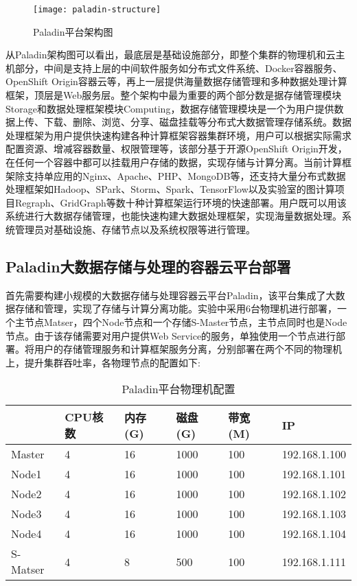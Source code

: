 \begin{figure}[H] %
	\centering
	\texttt{[image: paladin-structure]}
	\caption{Paladin平台架构图}
\end{figure}

从Paladin架构图可以看出，最底层是基础设施部分，即整个集群的物理机和云主机部分，中间是支持上层的中间软件服务如分布式文件系统、Docker容器服务、OpenShift Origin容器云等，再上一层提供海量数据存储管理和多种数据处理计算框架，顶层是Web服务层。整个架构中最为重要的两个部分数是据存储管理模块Storage和数据处理框架模块Computing，数据存储管理模块是一个为用户提供数据上传、下载、删除、浏览、分享、磁盘挂载等分布式大数据管理存储系统。数据处理框架为用户提供快速构建各种计算框架容器集群环境，用户可以根据实际需求配置资源、增减容器数量、权限管理等，该部分基于开源OpenShift Origin开发，在任何一个容器中都可以挂载用户存储的数据，实现存储与计算分离。当前计算框架除支持单应用的Nginx、Apache、PHP、MongoDB等，还支持大量分布式数据处理框架如Hadoop、SPark、Storm、Spark、TensorFlow以及实验室的图计算项目Regraph、GridGraph等数十种计算框架运行环境的快速部署。用户既可以用该系统进行大数据存储管理，也能快速构建大数据处理框架，实现海量数据处理。系统管理员对基础设施、存储节点以及系统权限等进行管理。

\subsection{Paladin大数据存储与处理的容器云平台部署}
首先需要构建小规模的大数据存储与处理容器云平台Paladin，该平台集成了大数据存储和管理，实现了存储与计算分离功能。实验中采用6台物理机进行部署，一个主节点Matser，四个Node节点和一个存储S-Master节点，主节点同时也是Node节点。由于该存储需要对用户提供Web Service的服务，单独使用一个节点进行部署。将用户的存储管理服务和计算框架服务分离，分别部署在两个不同的物理机上，提升集群吞吐率，各物理节点的配置如下:
\begin{table}[H]
	\centering\dawu[1.3]
	\caption{Paladin平台物理机配置}
	\begin{tabular}{|p{1.8cm}<{\centering}|p{1.5cm}<{\centering}|p{1.5cm}<{\centering}|p{1.5cm}<{\centering}|p{1.5cm}<{\centering}|p{3cm}<{\centering}|} \hline
		\diagbox[innerwidth=1.8cm]{节点}{资源} & CPU核数 & 内存(G) & 磁盘(G) & 带宽(M) & IP \\ \hline
		Master & 4 & 16 & 1000 & 100 & 192.168.1.100  \\ \hline
		Node1 & 4 & 16 & 1000 & 100  & 192.168.1.101 \\ \hline
		Node2 & 4 & 16 & 1000 & 100  & 192.168.1.102 \\ \hline
		Node3 & 4 & 16 & 1000 & 100  & 192.168.1.103 \\ \hline
		Node4 & 4 & 16 & 1000 & 100  & 192.168.1.104 \\ \hline
		S-Matser & 4 & 8 & 500 & 100  & 192.168.1.111 \\ \hline
	\end{tabular}
\end{table}

